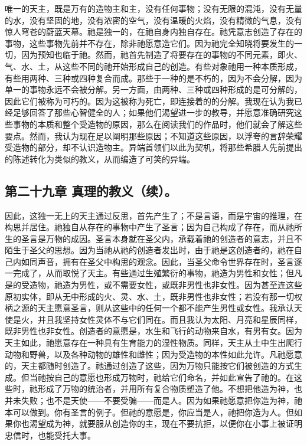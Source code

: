 唯一的天主，既是万有的造物主和主，没有任何事物；没有无限的混沌，没有无量的水，没有坚固的地，没有浓密的空气，没有温暖的火焰，没有精微的气息，没有惊人穹苍的蔚蓝天幕。祂是独一的，在祂自身内独自存在。祂凭意志创造了存在的事物，这些事物先前并不存在，除非祂愿意造它们。因为祂完全知晓将要发生的一切，因为预知也临于祂。然而，祂首先制造了将要存在的事物的不同元素，即火、气、水、土，从这些不同的祂开始形成自己的创造。有些对象祂用一种本质形成，有些用两种、三种或四种复合而成。那些于一种的是不朽的，因为不会分解，因为单一的事物永远不会被分解。另一方面，由两种、三种或四种形成的是可分解的，因此它们被称为可朽的。因为这被称为死亡，即连接着的的分解。我现在认为我已经足够回答了那些心智健全的人；如果他们渴望进一步的教导，并愿意准确研究这些事物的本质和整个受造物的原因，那么在阅读我们的作品时，他们就会了解这些要点。然而，我认为现在足以阐明那些原因；不知道这些原因，以浮夸的言辞荣耀受造物的部分，却不认识造物主。异端首领们以此为契机，将那些希腊人先前提出的陈述转化为类似的教义，从而编造了可笑的异端。\par


\subsection{第二十九章 真理的教义（续）。}

因此，这独一无上的天主通过反思，首先产生了；不是言语，而是宇宙的推理，在构思并居住。祂独自从存在的事物中产生了圣言；因为自己构成了存在，而从祂所生的圣言是万物的成因。圣言本身就在圣父内，承载着祂的创造者的意志，并且不陌生于圣父的思想。因为当祂从祂的创造者发出时，由于祂是这创造者的，祂在自己内如同声音，拥有在圣父中构思的观念。因此，当圣父命令世界存在时，圣言逐一完成了，从而取悦了天主。有些通过生殖繁衍的事物，祂造为男性和女性；但凡是的受造物，祂造为男性，或不需要女性，或既非男性也非女性。因为甚至连这些原初实体，即从无中形成的火、灵、水、土，既非男性也非女性；若没有那一切权柄之源的天主愿意圣言，则从这些中的任何一个都不能产生男性或女性。我承认天使是火，并且我坚持女性灵体不与它们同在。而且我认为太阳、月亮和星辰同样，既非男性也非女性。创造者的意愿是，水生和飞行的动物来自水，有男有女。因为天主如此，祂愿意存在一种具有生育能力的湿性物质。同样，天主从土中生出爬行动物和野兽，以及各种动物的雄性和雌性；因为受造物的本性如此允许。凡祂愿意的，天主都随时创造了。祂通过创造了这些，因为万物只能按它们被创造的方式生成。但当祂按自己的意愿也形成万物时，祂给它们命名，并如此宣告了祂的。在这些时，祂形成了万物的统治者，并用所有复合物质塑造了他。不想把他造为神，也并未失败；也不是天使——不要受骗——而是人。因为如果祂愿意把你造为神，祂本可以做到。你有圣言的例子。但祂的意愿是，你应当是人，祂把你造为人。但如果你也渴望成为神，就要服从创造你的主，现在不要抗拒，以便你在小事上被证明忠信时，也能受托大事。\par


